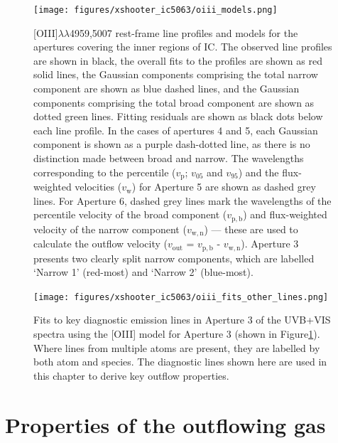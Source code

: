 \begin{figure}
	\texttt{[image: figures/xshooter\_ic5063/oiii\_models.png]}
	\caption[{[}OIII{]} line profile models for the apertures extracted along the radio axis of Xshooter spectra of IC.]{[OIII]$\lambda\lambda$4959,5007 rest-frame line profiles and models for the apertures covering the inner regions of IC. The observed line profiles are shown in black, the overall fits to the profiles are shown as red solid lines, the Gaussian components comprising the total narrow component are shown as blue dashed lines, and the Gaussian components comprising the total broad component are shown as dotted green lines. Fitting residuals are shown as black dots below each line profile. In the cases of apertures 4 and 5, each Gaussian component is shown as a purple dash-dotted line, as there is no distinction made between broad and narrow. The wavelengths corresponding to the percentile ($v_\mathrm{p}$; $v_\mathrm{05}$ and $v_\mathrm{95}$) and the flux-weighted velocities ($v_\mathrm{w}$) for Aperture 5 are shown as dashed grey lines. For Aperture 6, dashed grey lines mark the wavelengths of the percentile velocity of the broad component ($v_\mathrm{p,b}$) and flux-weighted velocity of the narrow component ($v_\mathrm{w,n}$) --- these are used to calculate the outflow velocity ($v_\mathrm{out}$ = $v_\mathrm{p,b}$ - $v_\mathrm{w,n}$). Aperture 3 presents two clearly split narrow components, which are labelled `Narrow 1' (red-most) and `Narrow 2' (blue-most).}
	\label{fig: xshooter_ic5063: o3_models}
\end{figure}

\begin{figure}
	\texttt{[image: figures/xshooter\_ic5063/oiii\_fits\_other\_lines.png]}
	\caption[{[}OIII{]}-model fits to key emission lines used in the analysis of Xshooter observations of IC.]{Fits to key diagnostic emission lines in Aperture 3 of the UVB+VIS spectra using the [OIII] model for Aperture 3 (shown in Figure\;\ref{fig: xshooter_ic5063: o3_models}). Where lines from multiple atoms are present, they are labelled by both atom and species. The diagnostic lines shown here are used in this chapter to derive key outflow properties.}
	\label{fig: xshooter_ic5063: o3_models_all_lines}
\end{figure}

\newpage

\section{Properties of the outflowing gas}
\label{section: xshooter_ic5063: properties_of_outflowing_gas}

